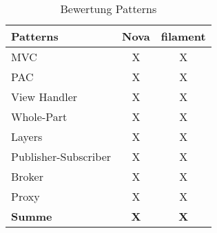 \begin{table}[]
    \caption{Bewertung Patterns}
    \label{tab:bewertung-patterns}
    \centering
    \begin{tabular}{|l|c|c|}
        \hline
        \textbf{Patterns}    & \textbf{Nova} & \textbf{filament} \\ \hline
        MVC                  & X             & X                 \\ \hline
        PAC                  & X             & X                 \\ \hline
        View Handler         & X             & X                 \\ \hline
        Whole-Part           & X             & X                 \\ \hline
        Layers               & X             & X                 \\ \hline
        Publisher-Subscriber & X             & X                 \\ \hline
        Broker               & X             & X                 \\ \hline
        Proxy                & X             & X                 \\ \hline
        \textbf{Summe}       & \textbf{X}    & \textbf{X}        \\ \hline
    \end{tabular}
\end{table}

\color{black}
